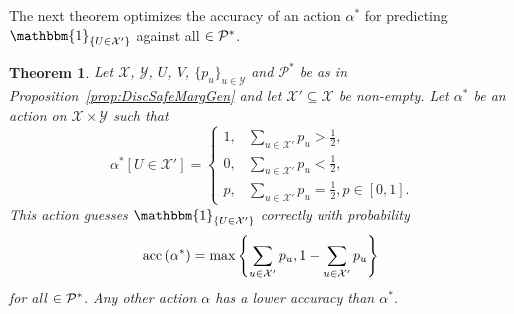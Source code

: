 \documentclass[a4paper]{report}
\theoremstyle{plain}
\newtheorem{theorem}{Theorem}[section]
\theoremstyle{definition}
\theoremstyle{remark}
\numberwithin{equation}{chapter}
\let\P\relax
\DeclareMathOperator{\P}{\mathbb{P}}
\DeclareMathOperator{\1}{\mathbbm{1}}
\newcommand{\X}{\mathcal{X}}
\newcommand{\Y}{\mathcal{Y}}
\DeclareMathOperator{\acc}{acc}
\newcommand{\Pmod}{\mathcal{P}^*}
\newcommand{\GeneralGenInd}{\1_{\{U\in\X'\}}}
\begin{document}
The next theorem optimizes the accuracy of an action $\alpha^*$ for predicting $\GeneralGenInd$ against all $\P\in\Pmod$.
\begin{theorem}\label{thm:DiscAccOpt}
Let $\X$, $\Y$, $U$, $V$, $\{p_u\}_{u\in\Y}$ and $\Pmod$ be as in Proposition~\ref{prop:DiscSafeMargGen} and let $\X'\subseteq\X$ be non-empty. Let $\alpha^*$ be an action on $\X\times\Y$ such that
\begin{equation}\
\alpha^*[U\in\X']=\begin{cases}
1,&\sum_{u\in\X'}p_u>\frac{1}{2},\\
0,&\sum_{u\in\X'}p_u<\frac{1}{2},\\
p,&\sum_{u\in\X'}p_u=\frac{1}{2},p\in[0,1].
\end{cases}
\end{equation}
This action guesses $\GeneralGenInd$ correctly with probability
\begin{equation}
\acc^{\P}\left(\alpha^*\right)=\max\left\{\sum_{u\in\X'}p_u,1-\sum_{u\in\X'}p_u\right\}
\end{equation}
for all $\P\in\Pmod$. Any other action $\alpha$ has a lower accuracy than $\alpha^*$.
\end{theorem}
\end{document}

